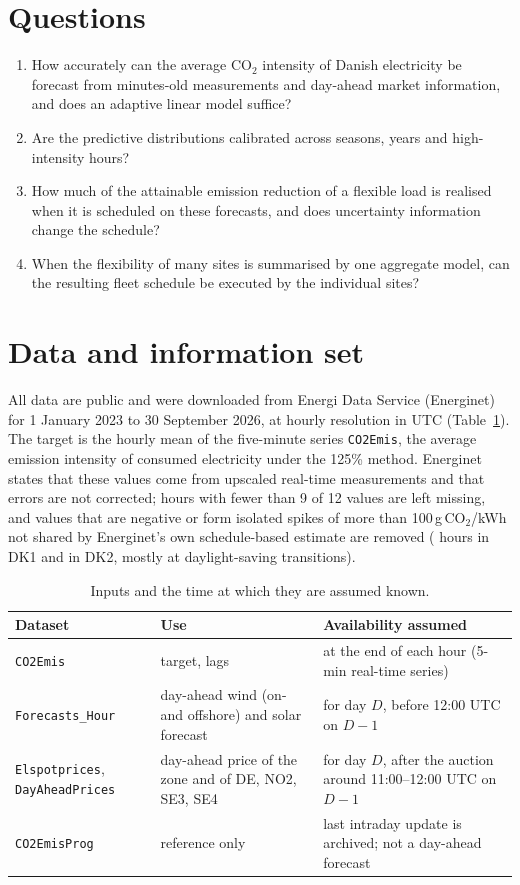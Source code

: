 \documentclass[11pt,a4paper]{article}
\newcommand{\gk}{g\,CO$_2$/kWh}
\begin{document}
\section{Questions}
\begin{enumerate}
\item How accurately can the average CO$_2$ intensity of Danish electricity be forecast from minutes-old measurements and day-ahead market information, and does an adaptive linear model suffice?
\item Are the predictive distributions calibrated across seasons, years and high-intensity hours?
\item How much of the attainable emission reduction of a flexible load is realised when it is scheduled on these forecasts, and does uncertainty information change the schedule?
\item When the flexibility of many sites is summarised by one aggregate model, can the resulting fleet schedule be executed by the individual sites?
\end{enumerate}

\section{Data and information set}
\label{sec:data}
All data are public and were downloaded from Energi Data Service (Energinet) for 1 January 2023 to 30 September 2026, at hourly resolution in UTC (Table~\ref{tab:data}).
The target is the hourly mean of the five-minute series \texttt{CO2Emis}, the average emission intensity of consumed electricity under the 125\% method.
Energinet states that these values come from upscaled real-time measurements and that errors are not corrected; hours with fewer than 9 of 12 values are left missing, and values that are negative or form isolated spikes of more than 100\,\gk{} not shared by Energinet's own schedule-based estimate are removed (\DKaflagged{} hours in DK1 and \DKbflagged{} in DK2, mostly at daylight-saving transitions).

\begin{table}[h]
\centering\small
\caption{Inputs and the time at which they are assumed known.}
\label{tab:data}
\begin{tabular}{@{}p{3.3cm}p{5.4cm}p{6.3cm}@{}}
\toprule
Dataset & Use & Availability assumed\\
\midrule
\texttt{CO2Emis} & target, lags & at the end of each hour (5-min real-time series)\\
\texttt{Forecasts\_Hour} & day-ahead wind (on- and offshore) and solar forecast & for day $D$, before 12:00 UTC on $D-1$\\
\texttt{Elspotprices}, \texttt{DayAheadPrices} & day-ahead price of the zone and of DE, NO2, SE3, SE4 & for day $D$, after the auction around 11:00--12:00 UTC on $D-1$\\
\texttt{CO2EmisProg} & reference only & last intraday update is archived; not a day-ahead forecast\\
\bottomrule
\end{tabular}
\end{table}
\end{document}
